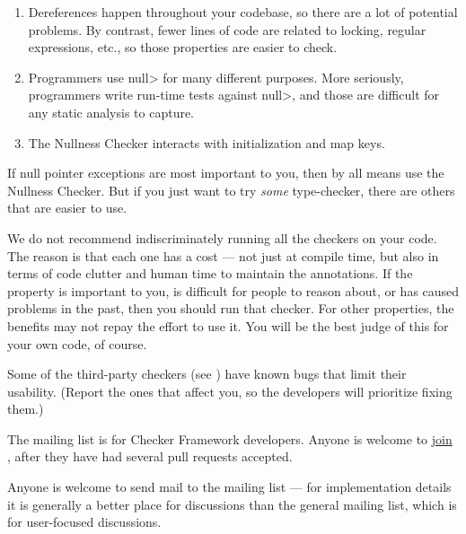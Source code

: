 \begin{enumerate}
\item
  Dereferences happen throughout your codebase, so there are a lot of
  potential problems.  By contrast, fewer lines of code are related to
  locking, regular expressions, etc., so those properties are easier to
  check.
\item
  Programmers use \<null> for many different purposes.  More seriously,
  programmers write run-time tests against \<null>, and those are difficult
  for any static analysis to capture.
\item
  The Nullness Checker interacts with initialization and map keys.
\end{enumerate}

If null pointer exceptions are most important to you, then by all means use
the Nullness Checker.  But if you just want to try \emph{some}
type-checker, there are others that are easier to use.

We do not recommend indiscriminately running all the checkers on your code.
The reason is that each one has a cost --- not just at compile time, but
also in terms of code clutter and human time to maintain the annotations.
If the property is important to you, is difficult for people to reason
about, or has caused problems in the past, then you should run that
checker.  For other properties, the benefits may not repay the effort to
use it.  You will be the best judge of this for your own code, of course.

Some of the third-party checkers (see
)
have known bugs that limit their
usability.  (Report the ones that affect you, so the developers
will prioritize fixing them.)



The  mailing list is for
Checker Framework developers.  Anyone is welcome to
\href{https://groups.google.com/forum/#!forum/checker-framework-dev}{join
  }, after they have had several pull requests
accepted.

Anyone is welcome to send mail to the
 mailing list --- for
implementation details it is generally a better place for discussions than
the general  mailing list,
which is for user-focused discussions.

